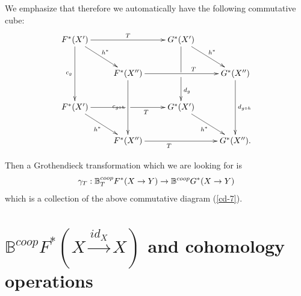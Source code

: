 \documentclass[a4paper]{amsart}
\begin{document}
\begin{rem}
We emphasize that therefore we automatically have the following commutative cube:
\begin{equation}\label{ccube-2}
\xymatrix
{ F^*(X') \ar[dd]_{c_g } \ar[rd]^{h^*} \ar[rr]^{T} && G^*(X') \ar'[d][dd]^{d_g} \ar[rd]^{h^*} \\
& F^*(X'') \ar[dd]_{ c_{g \circ h}} \ar[rr]^{ \hspace{1cm} T}  &&  G^*(X'') \ar[dd]^{d_{g \circ h}} \\
F^*(X') \ar'[r] [rr]_{T \quad \quad }  \ar[rd]_{h^*} && G^*(X') \ar[rd]_{h^*} \\
& F^*(X'') \ar[rr] _{T \quad \quad  \quad }  &&  G^*(X'').
}
\end{equation}
\end{rem}

\begin{cor}
Then a Grothendieck transformation which we are looking for is 
$$\gamma_T: \mathbb B^{coop}_T F^*(X \to Y)  \to  \mathbb B^{coop} G^*(X \to Y)$$
which is a collection of the above commutative diagram (\ref{cd-7}).
\end{cor}

\section{$ \mathbb B^{coop}F^{*}(X \xrightarrow {id_X} X)$ and cohomology operations}
\end{document}
